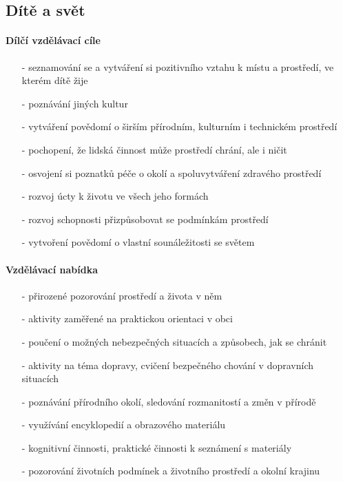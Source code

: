 			\subsection{Dítě a svět}
				\textit{} \citep[s.~29]{RVP}

				\paragraph{Dílčí vzdělávací cíle}

				\begin{itemize}
				\setlength\itemsep{-2mm}
					\item[-]seznamování se a vytváření si pozitivního vztahu k místu a prostředí, ve kterém dítě žije
					\item[-]poznávání jiných kultur
					\item[-]vytváření povědomí o širším přírodním, kulturním i technickém prostředí
					\item[-]pochopení, že lidská činnost může prostředí chrání, ale i ničit
					\item[-]osvojení si poznatků péče o okolí a spoluvytváření zdravého prostředí
					\item[-]rozvoj úcty k životu ve všech jeho formách
					\item[-]rozvoj schopnosti přizpůsobovat se podmínkám prostředí
					\item[-]vytvoření povědomí o vlastní sounáležitosti se světem
				\end{itemize}
				
				\paragraph{Vzdělávací nabídka}

				\begin{itemize}
				\setlength\itemsep{-2mm}
					\item[-]přirozené pozorování prostředí a života v něm
					\item[-]aktivity zaměřené na praktickou orientaci v obci
					\item[-]poučení o možných nebezpečných situacích a způsobech, jak se chránit
					\item[-]aktivity na téma dopravy, cvičení bezpečného chování v dopravních situacích
					\item[-]poznávání přírodního okolí, sledování rozmanitostí a změn v přírodě
					\item[-]využívání encyklopedií a obrazového materiálu
					\item[-]kognitivní činnosti, praktické činnosti k seznámení s materiály
					\item[-]pozorování životních podmínek a životního prostředí a okolní krajinu
				\end{itemize}
				
